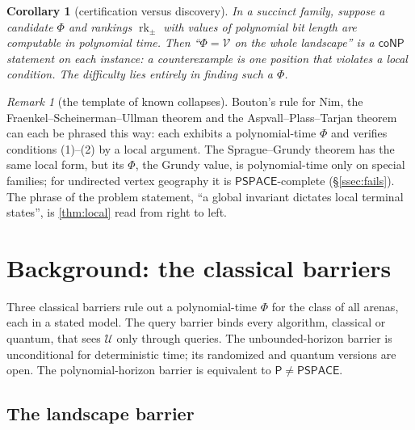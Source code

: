 \documentclass[11pt]{amsart}
\theoremstyle{plain}
\newtheorem{corollary}[theorem]{Corollary}
\theoremstyle{definition}
\theoremstyle{remark}
\newtheorem{remark}[theorem]{Remark}
\numberwithin{equation}{section}
\newcommand{\val}{\mathcal{V}}            %
\newcommand{\pay}{\mathcal{U}}            %
\newcommand{\rk}{\operatorname{rk}}
\newcommand{\cls}[1]{\mathsf{#1}}
\newcommand{\PSPACE}{\cls{PSPACE}}
\newcommand{\coNP}{\cls{coNP}}
\newcommand{\Pclass}{\cls{P}}
\begin{document}
\begin{corollary}[certification versus discovery]\label{cor:certify}
In a succinct family, suppose a candidate $\Phi$ and rankings $\rk_{\pm}$ with values of polynomial bit length are computable in polynomial time. Then ``$\Phi=\val$ on the whole landscape'' is a $\coNP$ statement on each instance: a counterexample is one position that violates a local condition. The difficulty lies entirely in finding such a $\Phi$.
\end{corollary}

\begin{remark}[the template of known collapses]\label{rem:template}
Bouton's rule for Nim, the Fraenkel--Scheinerman--Ullman theorem and the Aspvall--Plass--Tarjan theorem can each be phrased this way: each exhibits a polynomial-time $\Phi$ and verifies conditions (1)--(2) by a local argument. The Sprague--Grundy theorem has the same local form, but its $\Phi$, the Grundy value, is polynomial-time only on special families; for undirected vertex geography it is $\PSPACE$-complete (\S\ref{ssec:fails}). The phrase of the problem statement, ``a global invariant dictates local terminal states'', is \cref{thm:local} read from right to left.
\end{remark}

\section{Background: the classical barriers}\label{sec:barriers}

Three classical barriers rule out a polynomial-time $\Phi$ for the class of all arenas, each in a stated model. The query barrier binds every algorithm, classical or quantum, that sees $\pay$ only through queries. The unbounded-horizon barrier is unconditional for deterministic time; its randomized and quantum versions are open. The polynomial-horizon barrier is equivalent to $\Pclass\neq\PSPACE$.

\subsection{The landscape barrier}
\end{document}
